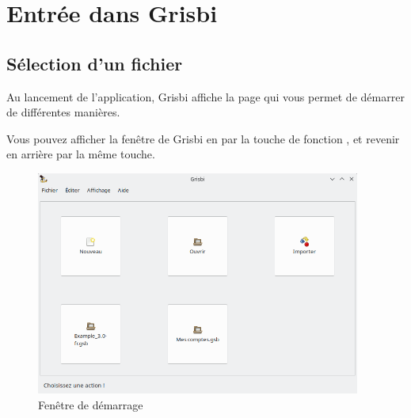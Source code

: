 
\chapter{Entrée dans Grisbi\label{entrance}}

\section{Sélection d'un fichier\label{select-file}}


Au lancement de l'application, Grisbi affiche la page qui vous permet de démarrer de différentes manières.


Vous pouvez afficher la fenêtre de Grisbi en  par la touche de fonction , et revenir en arrière par la même touche.			%


\begin{figure}[htbp]			%
	\begin{center}					%
		\includegraphics[width=0.95\textwidth]{image/screenshot/home_start_grisbi}		%
	\end{center}
	\caption{Fenêtre de démarrage}			%
	\label{home_start_grisbi}					%
\end{figure}


